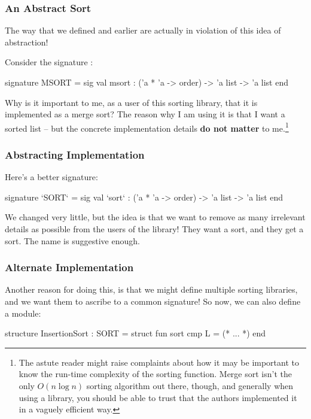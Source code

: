 \documentclass[aspectratio=169]{beamer}
\begin{document}
\begin{frame}[fragile]
  \frametitle{An Abstract Sort}

  The way that we defined  and  earlier are actually
  in violation of this idea of abstraction!

  \pause
  \vspace{\fill}

  Consider the signature :

  \begin{codeblock}
    signature MSORT =
      sig
        val msort : ('a * 'a -> order) -> 'a list -> 'a list
      end
  \end{codeblock}

  \pause
  \vspace{\fill}

  Why is it important to me, as a user of this sorting library, that it
  is implemented as a merge sort? The reason why I am using it is that I
  want a sorted list -- but the concrete implementation details
  \textbf{do not matter} to me.\footnote{The astute reader might raise complaints about how it
  may be important to know the run-time complexity of the sorting function.
  Merge sort isn't the only $O(n \log n)$ sorting algorithm out there, though,
  and generally when using a library, you should be able to trust that the
  authors implemented it in a vaguely efficient way.}
\end{frame}

\begin{frame}[fragile]
  \frametitle{Abstracting Implementation}

  Here's a better signature:

  \begin{codeblock}
    signature `SORT` =
      sig
        val `sort` : ('a * 'a -> order) -> 'a list -> 'a list
      end
  \end{codeblock}

  \pause
  \vspace{\fill}

  We changed very little, but the idea is that we want to remove as many irrelevant
  details as possible from the users of the library! They want a sort, and they
  get a sort. The name is suggestive enough.
\end{frame}

\begin{frame}[fragile]
  \frametitle{Alternate Implementation}

  Another reason for doing this, is that we might define multiple sorting libraries,
  and we want them to ascribe to a common signature! So now, we can also define a
   module:

  \pause
  \vspace{\fill}

  \begin{codeblock}
    structure InsertionSort : SORT =
      struct
        fun sort cmp L = (* ... *)
      end
  \end{codeblock}
\end{frame}
\end{document}
